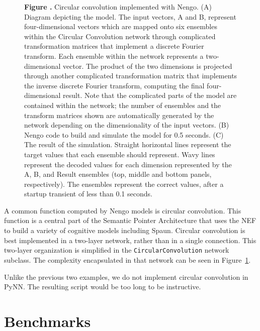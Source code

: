 \documentclass{frontiersSCNS}
\begin{document}
\begin{figure}
\begin{center}
\begin{minipage}{0.46\textwidth}
  \end{minipage}
\end{center}
 \textbf{\label{fig:cconv} Figure
   .}{
   Circular convolution implemented with Nengo.
   (A) Diagram depicting the model.
   The input vectors, A and B, represent four-dimensional vectors
   which are mapped onto six ensembles within the
   Circular Convolution network through
   complicated transformation matrices
   that implement a discrete Fourier transform.
   Each ensemble within the network represents a
   two-dimensional vector. The product of the two dimensions
   is projected through another complicated transformation matrix
   that implements the inverse discrete Fourier transform,
   computing the final four-dimensional result.
   Note that the complicated parts of the model
   are contained within the network;
   the number of ensembles and the transform matrices shown
   are automatically generated by the network depending on
   the dimensionality of the input vectors.
   (B) Nengo code to build and simulate the model
   for 0.5 seconds.
   (C) The result of the simulation.
   Straight horizontal lines represent
   the target values that each ensemble
   should represent.
   Wavy lines represent the decoded values
   for each dimension represented by the
   A, B, and Result ensembles
   (top, middle and bottom panels, respectively).
   The ensembles represent the correct values,
   after a startup transient of less than 0.1 seconds.}
\end{figure}

A common function computed by Nengo models
is circular convolution.
This function is a central part
of the Semantic Pointer Architecture \citep{eliasmith2013}
that uses the NEF to build
a variety of cognitive models including Spaun.
Circular convolution
is best implemented in a two-layer network,
rather than in a single connection.
This two-layer organization is simplified in
the \texttt{CircularConvolution} network subclass.
The complexity encapsulated in that network
can be seen in Figure~\ref{fig:cconv}.

Unlike the previous two examples,
we do not implement
circular convolution in PyNN.
The resulting script would be
too long to be instructive.

\section{Benchmarks} \label{sec:benchmark}
\end{document}
